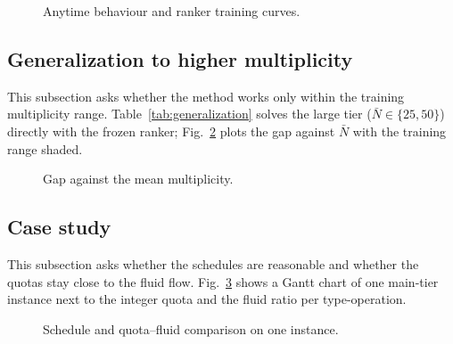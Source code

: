\begin{figure}
\caption{Anytime behaviour and ranker training curves.}\label{fig:anytime}
\end{figure}

\subsection{Generalization to higher multiplicity}\label{sec:generalization}
This subsection asks whether the method works only within the training multiplicity range. Table~\ref{tab:generalization}
solves the large tier ($\bar N \in \{25, 50\}$) directly with the frozen ranker; Fig.~\ref{fig:gen} plots the gap against
$\bar N$ with the training range shaded. 

\begin{table}
\centering\small
\caption{Multiplicity extrapolation beyond the training range ($\bar N \le 12$).}\label{tab:generalization}

\end{table}

\begin{figure}
\caption{Gap against the mean multiplicity.}\label{fig:gen}
\end{figure}

\subsection{Case study}\label{sec:case}
This subsection asks whether the schedules are reasonable and whether the quotas stay close to the fluid flow.
Fig.~\ref{fig:case} shows a Gantt chart of one main-tier instance next to the integer quota and the fluid ratio per
type-operation.

\begin{figure}
\caption{Schedule and quota--fluid comparison on one instance.}\label{fig:case}
\end{figure}
